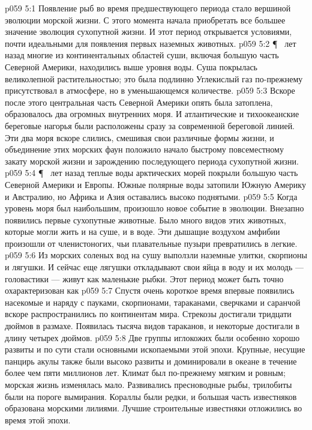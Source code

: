 \vs p059 5:1 Появление рыб во время предшествующего периода стало вершиной эволюции морской жизни. С этого момента начала приобретать все большее значение эволюция сухопутной жизни. И этот период открывается условиями, почти идеальными для появления первых наземных животных.
\vs p059 5:2 \P\  лет назад многие из континентальных областей суши, включая большую часть Северной Америки, находились выше уровня воды. Суша покрылась великолепной растительностью; это была подлинно  Углекислый газ по\hyp{}прежнему присутствовал в атмосфере, но в уменьшающемся количестве.
\vs p059 5:3 Вскоре после этого центральная часть Северной Америки опять была затоплена, образовалось два огромных внутренних моря. И атлантические и тихоокеанские береговые нагорья были расположены сразу за современной береговой линией. Эти два моря вскоре слились, смешивая свои различные формы жизни, и объединение этих морских фаун положило начало быстрому повсеместному закату морской жизни и зарождению последующего периода сухопутной жизни.
\vs p059 5:4 \P\  лет назад теплые воды арктических морей покрыли большую часть Северной Америки и Европы. Южные полярные воды затопили Южную Америку и Австралию, но Африка и Азия оставались высоко поднятыми.
\vs p059 5:5 Когда уровень моря был наибольшим,  произошло новое событие в эволюции. Внезапно появились первые сухопутные животные. Было много видов этих животных, которые могли жить и на суше, и в воде. Эти дышащие воздухом амфибии произошли от членистоногих, чьи плавательные пузыри превратились в легкие.
\vs p059 5:6 Из морских соленых вод на сушу выползли наземные улитки, скорпионы и лягушки. И сейчас еще лягушки откладывают свои яйца в воду и их молодь --- головастики --- живут как маленькие рыбки. Этот период может быть точно охарактеризован как 
\vs p059 5:7 Спустя очень короткое время впервые появились насекомые и наряду с пауками, скорпионами, тараканами, сверчками и саранчой вскоре распространились по континентам мира. Стрекозы достигали тридцати дюймов в размахе. Появилась тысяча видов тараканов, и некоторые достигали в длину четырех дюймов.
\vs p059 5:8 Две группы иглокожих были особенно хорошо развиты и по сути стали основными ископаемыми этой эпохи. Крупные, несущие панцирь акулы также были высоко развиты и доминировали в океане в течение более чем пяти миллионов лет. Климат был по\hyp{}прежнему мягким и ровным; морская жизнь изменялась мало. Развивались пресноводные рыбы, трилобиты были на пороге вымирания. Кораллы были редки, и большая часть известняков образована морскими лилиями. Лучшие строительные известняки отложились во время этой эпохи.
